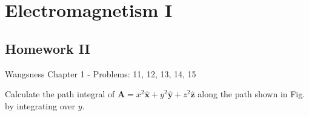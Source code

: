 \documentclass[crop=false,class=article,oneside]{standalone}
\begin{document}
    \ifx\ifphysicscourseselectromagnetismI\undefined
        \section*{Electromagnetism I}
        \setcounter{section}{2}
        \renewcommand\thefigure{%
            \arabic{section}.\arabic{figure}%
        }
        \renewcommand\thesubfigure{%
            \arabic{section}.\arabic{figure}.\arabic{subfigure}%
        }
    \fi    
    \subsection{Homework II}
        Wangsness Chapter 1 - Problems: 11, 12, 13, 14, 15
        \begin{problem}[Wangsness 1-11]
            \label{problem:EMAG_1_Wangsness_1_11}
            Calculate the path integral of
            $\mathbf{A}=x^{2}\hat{\mathbf{x}}
            +y^{2}\hat{\mathbf{y}}+z^{2}\hat{\mathbf{z}}$
            along the path shown in Fig.~
            by integrating over $y$.
        \end{problem}
\end{document}

